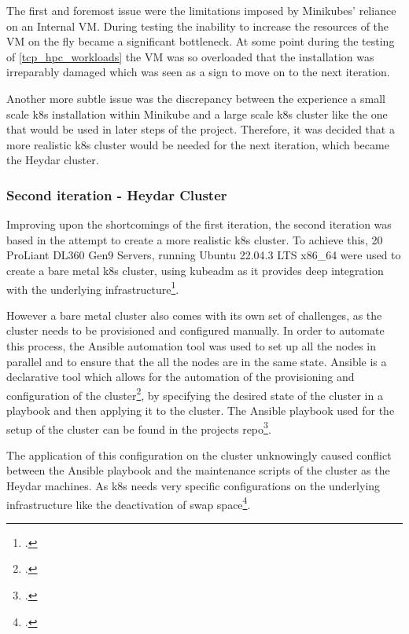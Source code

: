 The first and foremost issue were the limitations imposed by Minikubes' reliance on an Internal \ac{VM}.
During testing the inability to increase the resources of the \ac{VM}  on the fly  became a significant bottleneck.
At some point during the testing of \ref{tcp_hpc_workloads} the \ac{VM} was so overloaded that the installation was irreparably damaged which was seen as a sign to move on to the next iteration.

Another more subtle issue was the discrepancy between the experience a small scale \ac{k8s} installation within Minikube and a large scale \ac{k8s} cluster like the one that would be used in later steps of the project.
Therefore, it was decided that a more realistic \ac{k8s} cluster would be needed for the next iteration, which became the Heydar cluster.

\subsubsection{Second iteration - Heydar Cluster}
\label{heydar_cluster}

Improving upon the shortcomings of the first iteration, the second iteration was based in the attempt to create a more realistic \ac{k8s} cluster.
To achieve this, 20 ProLiant DL360 Gen9 Servers, running Ubuntu 22.04.3 LTS x86\_64 were used to create a bare metal \ac{k8s} cluster,
using kubeadm as it provides deep integration with the underlying infrastructure\footcite{CreatingClusterKubeadm}.

However a bare metal cluster also comes with its own set of challenges, as the cluster needs to be provisioned and configured manually.
In order to automate this process, the Ansible automation tool was used to set up all the nodes in parallel and to ensure that the all the nodes are in the same state.
Ansible is a declarative tool which allows for the automation of the provisioning and configuration of the cluster\footcite{Ansible2023}, by specifying the desired state of the cluster in a playbook and then applying it to the cluster.
The Ansible playbook used for the setup of the cluster can be found in the projects repo\footcite{ansible_scipt}.

The application of this configuration on the cluster unknowingly caused conflict between the Ansible playbook and the maintenance scripts of the cluster as the Heydar machines.
As \ac{k8s} needs very specific configurations on the underlying infrastructure like the deactivation of swap space\footcite{InstallingKubeadm}.

